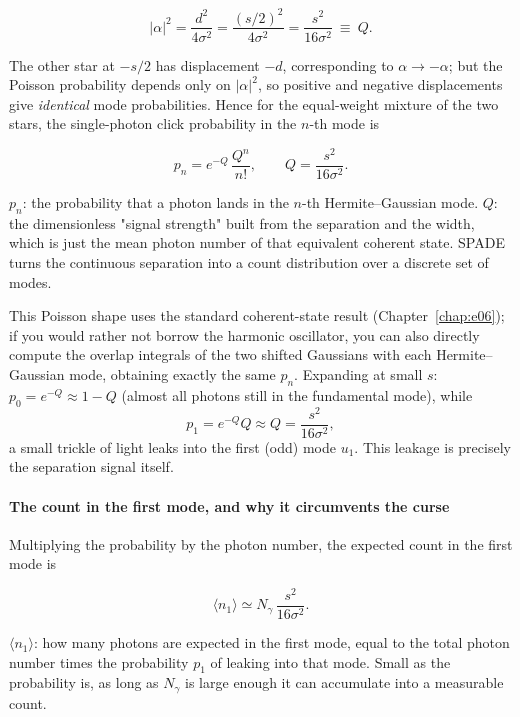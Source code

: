 \[
  |\alpha|^{2}=\frac{d^{2}}{4\sigma^{2}}
  =\frac{(s/2)^{2}}{4\sigma^{2}}
  =\frac{s^{2}}{16\sigma^{2}}\ \equiv\ Q.
\]

The other star at $-s/2$ has displacement $-d$, corresponding to $\alpha\to-\alpha$; but the Poisson probability depends only on $|\alpha|^2$, so positive and negative displacements give \emph{identical} mode probabilities. Hence for the equal-weight mixture of the two stars, the single-photon click probability in the $n$-th mode is

\begin{equation}
  p_{n}=e^{-Q}\,\frac{Q^{n}}{n!},
  \qquad
  Q=\frac{s^{2}}{16\sigma^{2}}.
  \label{eq:e12-spade-prob}
\end{equation}
\begin{formulaexplain}
$p_n$: the probability that a photon lands in the $n$-th Hermite--Gaussian mode. $Q$: the dimensionless "signal strength" built from the separation and the width, which is just the mean photon number of that equivalent coherent state. SPADE turns the continuous separation into a count distribution over a discrete set of modes.
\end{formulaexplain}

This Poisson shape uses the standard coherent-state result (Chapter~\ref{chap:e06}); if you would rather not borrow the harmonic oscillator, you can also directly compute the overlap integrals of the two shifted Gaussians with each Hermite--Gaussian mode, obtaining exactly the same $p_n$. Expanding at small $s$: $p_0=e^{-Q}\approx1-Q$ (almost all photons still in the fundamental mode), while
\[
  p_1=e^{-Q}Q\approx Q=\frac{s^{2}}{16\sigma^{2}},
\]
a small trickle of light leaks into the first (odd) mode $u_1$. This leakage is precisely the separation signal itself.

\paragraph{The count in the first mode, and why it circumvents the curse}
\label{sec:e12-mode-fisher}

Multiplying the probability by the photon number, the expected count in the first mode is

\begin{equation}
  \langle n_1\rangle\simeq N_\gamma\,\frac{s^{2}}{16\sigma^{2}}.
  \label{eq:e12-n1}
\end{equation}
\begin{formulaexplain}
$\langle n_1\rangle$: how many photons are expected in the first mode, equal to the total photon number times the probability $p_1$ of leaking into that mode. Small as the probability is, as long as $N_\gamma$ is large enough it can accumulate into a measurable count.
\end{formulaexplain}

